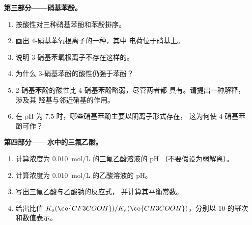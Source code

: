 \begin{problem}
\medskip
\noindent\textbf{第三部分——硝基苯酚。}
\begin{enumerate}[resume]
  \item 按酸性对三种硝基苯酚和苯酚排序。
  \item 画出 4-硝基苯氧根离子的一种，其中
        电荷位于硝基上。
  \item 说明 3-硝基苯氧根离子不存在这样的。
  \item 为什么 3-硝基苯酚的酸性仍强于苯酚？
  \item 2-硝基苯酚的酸性比 4-硝基苯酚略弱，尽管两者都
        具有。请提出一种解释，涉及其
        羟基与邻近硝基的作用。
  \item 在 pH 为 7.5 时，哪些硝基苯酚主要以阴离子形式存在，
        这为何使 4-硝基苯酚可作？
\end{enumerate}

\medskip
\noindent\textbf{第四部分——水中的三氟乙酸。}
\begin{enumerate}[resume]
  \item 计算浓度为 \qty{0.010}{mol/L} 的三氟乙酸溶液的 pH
        （不要假设为弱解离）。
  \item 计算浓度为 \qty{0.010}{mol/L} 的乙酸溶液的 pH。
  \item 写出三氟乙酸与乙酸钠的反应式，
        并计算其平衡常数。
  \item 给出比值 $K_a(\ce{CF3COOH})/K_a(\ce{CH3COOH})$，分别以
        10 的幂次和数值表示。
\end{enumerate}
\end{problem}

